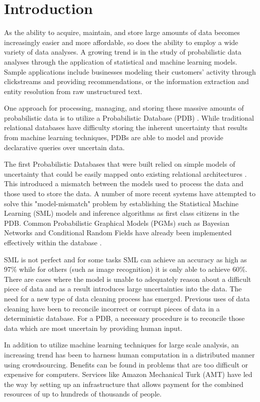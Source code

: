 \section{Introduction}
As the ability to acquire, maintain, and store large amounts of data becomes increasingly easier and more affordable, so does the ability to employ a wide variety of data analyses.  A growing trend is in the study of probabilistic data analyses through the application of statistical and machine learning models.  Sample applications include businesses modeling their customers' activity through clickstreams and providing recommendations, or the information extraction and entity resolution from raw unstructured text.

One approach for processing, managing, and storing these massive amounts of probabilistic data is to utilize a Probabilistic Database (PDB) \cite{Dalvi07}.  While traditional relational databases have difficulty storing the inherent uncertainty that results from machine learning techniques, PDBs are able to model and provide declarative queries over uncertain data.

The first Probabilistic Databases that were built relied on simple models of uncertainty that could be easily mapped onto existing relational architectures \cite{Barbara92}.  This introduced a mismatch between the models used to process the data and those used to store the data.  A number of more recent systems have attempted to solve this "model-mismatch" problem by establishing the Statistical Machine Learning (SML) models and inference algorithms as first class citizens in the PDB.  Common Probabilistic Graphical Models (PGMs) such as Bayesian Networks and Conditional Random Fields have already been implemented effectively within the database \cite{Sen09, Wang08, Wang11}.  

SML is not perfect and for some tasks SML can achieve an accuracy as high as 97\% while for others (such as image recognition) it is only able to achieve 60\%.  There are cases where the model is unable to adequately reason about a difficult piece of data and as a result introduces large uncertainties into the data.  The need for a new type of data cleaning process has emerged.  Previous uses of data cleaning have been to reconcile incorrect or corrupt pieces of data in a deterministic database.  For a PDB, a necessary procedure is to reconcile those data which are most uncertain by providing human input.  

In addition to utilize machine learning techniques for large scale analysis, an increasing trend has been to harness human computation in a distributed manner using crowdsourcing.  Benefits can be found in problems that are too difficult or expensive for computers.  Services like Amazon Mechanical Turk (AMT) have led the way by setting up an infrastructure that allows payment for the combined resources of up to hundreds of thousands of people.

